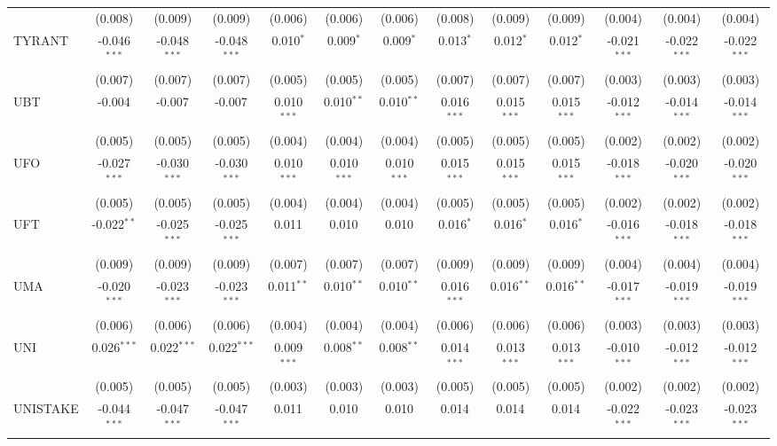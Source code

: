 \begin{table}[!htbp]
\begin{tabular}{@{\extracolsep{5pt}}lcccccccccccc}
  & (0.008) & (0.009) & (0.009) & (0.006) & (0.006) & (0.006) & (0.008) & (0.009) & (0.009) & (0.004) & (0.004) & (0.004) \\
 TYRANT & -0.046$^{***}$ & -0.048$^{***}$ & -0.048$^{***}$ & 0.010$^{*}$ & 0.009$^{*}$ & 0.009$^{*}$ & 0.013$^{*}$ & 0.012$^{*}$ & 0.012$^{*}$ & -0.021$^{***}$ & -0.022$^{***}$ & -0.022$^{***}$ \\
  & (0.007) & (0.007) & (0.007) & (0.005) & (0.005) & (0.005) & (0.007) & (0.007) & (0.007) & (0.003) & (0.003) & (0.003) \\
 UBT & -0.004$^{}$ & -0.007$^{}$ & -0.007$^{}$ & 0.010$^{***}$ & 0.010$^{**}$ & 0.010$^{**}$ & 0.016$^{***}$ & 0.015$^{***}$ & 0.015$^{***}$ & -0.012$^{***}$ & -0.014$^{***}$ & -0.014$^{***}$ \\
  & (0.005) & (0.005) & (0.005) & (0.004) & (0.004) & (0.004) & (0.005) & (0.005) & (0.005) & (0.002) & (0.002) & (0.002) \\
 UFO & -0.027$^{***}$ & -0.030$^{***}$ & -0.030$^{***}$ & 0.010$^{***}$ & 0.010$^{***}$ & 0.010$^{***}$ & 0.015$^{***}$ & 0.015$^{***}$ & 0.015$^{***}$ & -0.018$^{***}$ & -0.020$^{***}$ & -0.020$^{***}$ \\
  & (0.005) & (0.005) & (0.005) & (0.004) & (0.004) & (0.004) & (0.005) & (0.005) & (0.005) & (0.002) & (0.002) & (0.002) \\
 UFT & -0.022$^{**}$ & -0.025$^{***}$ & -0.025$^{***}$ & 0.011$^{}$ & 0.010$^{}$ & 0.010$^{}$ & 0.016$^{*}$ & 0.016$^{*}$ & 0.016$^{*}$ & -0.016$^{***}$ & -0.018$^{***}$ & -0.018$^{***}$ \\
  & (0.009) & (0.009) & (0.009) & (0.007) & (0.007) & (0.007) & (0.009) & (0.009) & (0.009) & (0.004) & (0.004) & (0.004) \\
 UMA & -0.020$^{***}$ & -0.023$^{***}$ & -0.023$^{***}$ & 0.011$^{**}$ & 0.010$^{**}$ & 0.010$^{**}$ & 0.016$^{***}$ & 0.016$^{**}$ & 0.016$^{**}$ & -0.017$^{***}$ & -0.019$^{***}$ & -0.019$^{***}$ \\
  & (0.006) & (0.006) & (0.006) & (0.004) & (0.004) & (0.004) & (0.006) & (0.006) & (0.006) & (0.003) & (0.003) & (0.003) \\
 UNI & 0.026$^{***}$ & 0.022$^{***}$ & 0.022$^{***}$ & 0.009$^{***}$ & 0.008$^{**}$ & 0.008$^{**}$ & 0.014$^{***}$ & 0.013$^{***}$ & 0.013$^{***}$ & -0.010$^{***}$ & -0.012$^{***}$ & -0.012$^{***}$ \\
  & (0.005) & (0.005) & (0.005) & (0.003) & (0.003) & (0.003) & (0.005) & (0.005) & (0.005) & (0.002) & (0.002) & (0.002) \\
 UNISTAKE & -0.044$^{***}$ & -0.047$^{***}$ & -0.047$^{***}$ & 0.011$^{}$ & 0.010$^{}$ & 0.010$^{}$ & 0.014$^{}$ & 0.014$^{}$ & 0.014$^{}$ & -0.022$^{***}$ & -0.023$^{***}$ & -0.023$^{***}$ \\

\end{tabular}
\end{table}
